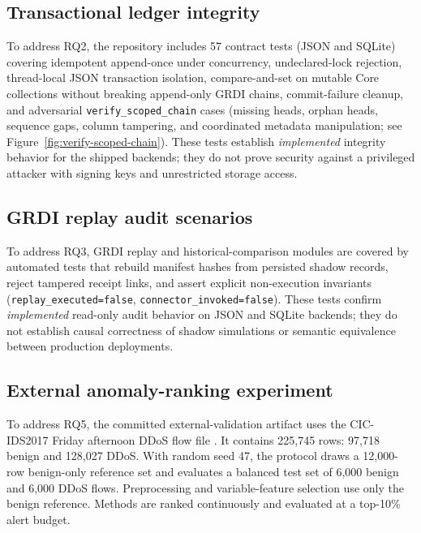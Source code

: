 \documentclass[11pt]{article}
\begin{document}
\subsection{Transactional ledger integrity}
\label{sec:txn-eval}

To address RQ2, the repository includes 57 contract tests (JSON and SQLite)
covering idempotent append-once under concurrency, undeclared-lock rejection,
thread-local JSON transaction isolation, compare-and-set on mutable Core
collections without breaking append-only GRDI chains, commit-failure cleanup,
and adversarial \texttt{verify\_scoped\_chain} cases (missing heads, orphan
heads, sequence gaps, column tampering, and coordinated metadata manipulation;
see Figure~\ref{fig:verify-scoped-chain}). These tests establish
\emph{implemented} integrity behavior for the shipped backends; they do not
prove security against a privileged attacker with signing keys and unrestricted
storage access.

\subsection{GRDI replay audit scenarios}
\label{sec:grdi-eval}

To address RQ3, GRDI replay and historical-comparison modules are covered by
automated tests that rebuild manifest hashes from persisted shadow records,
reject tampered receipt links, and assert explicit non-execution invariants
(\texttt{replay\_executed=false}, \texttt{connector\_invoked=false}).
These tests confirm \emph{implemented} read-only audit behavior on JSON and
SQLite backends; they do not establish causal correctness of shadow
simulations or semantic equivalence between production deployments.

\subsection{External anomaly-ranking experiment}

To address RQ5, the committed external-validation artifact uses the CIC-IDS2017
Friday afternoon DDoS flow file \cite{sharafaldin2018cicids}. It contains 225,745
rows: 97,718 benign and 128,027 DDoS. With random seed 47, the protocol draws a
12,000-row benign-only reference set and evaluates a balanced test set of
6,000 benign and 6,000 DDoS flows. Preprocessing and variable-feature selection
use only the benign reference. Methods are ranked continuously and evaluated
at a top-10\% alert budget.
\end{document}
